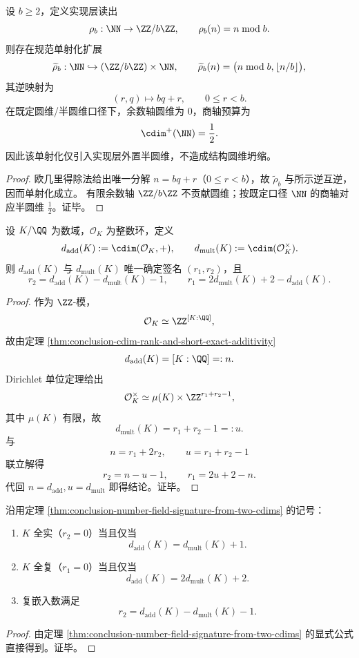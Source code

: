 \begin{proposition}[模读出的实现层外置轴预算]\label{prop:conclusion-mod-readout-external-half-circle-budget}
设 \(b\ge 2\)，定义实现层读出
\[
\rho_b:\NN\to \ZZ/b\ZZ,\qquad \rho_b(n)=n\bmod b.
\]
则存在规范单射化扩展
\[
\widetilde\rho_b:\NN\hookrightarrow (\ZZ/b\ZZ)\times\NN,\qquad
\widetilde\rho_b(n)=\bigl(n\bmod b,\lfloor n/b\rfloor\bigr),
\]
其逆映射为
\[
(r,q)\longmapsto bq+r,\qquad 0\le r<b.
\]
在既定圆维/半圆维口径下，余数轴圆维为 \(0\)，商轴预算为
\[
\cdim^+(\NN)=\frac12.
\]
因此该单射化仅引入实现层外置半圆维，不造成结构圆维坍缩。
\end{proposition}
\begin{proof}
欧几里得除法给出唯一分解 \(n=bq+r\)（\(0\le r<b\)），故 \(\widetilde\rho_b\) 与所示逆互逆，因而单射化成立。
有限余数轴 \(\ZZ/b\ZZ\) 不贡献圆维；按既定口径 \(\NN\) 的商轴对应半圆维 \(\frac12\)。证毕。
\end{proof}

\begin{theorem}[数域两类圆维决定阿基米德签名]\label{thm:conclusion-number-field-signature-from-two-cdims}
设 \(K/\QQ\) 为数域，\(\mathcal O_K\) 为整数环，定义
\[
d_{\mathrm{add}}(K):=\cdim(\mathcal O_K,+),\qquad
d_{\mathrm{mult}}(K):=\cdim(\mathcal O_K^\times).
\]
则 \(d_{\mathrm{add}}(K)\) 与 \(d_{\mathrm{mult}}(K)\) 唯一确定签名 \((r_1,r_2)\)，且
\[
r_2=d_{\mathrm{add}}(K)-d_{\mathrm{mult}}(K)-1,\qquad
r_1=2d_{\mathrm{mult}}(K)+2-d_{\mathrm{add}}(K).
\]
\end{theorem}
\begin{proof}
作为 \(\ZZ\)-模，
\[
\mathcal O_K\simeq \ZZ^{[K:\QQ]},
\]
故由定理 \ref{thm:conclusion-cdim-rank-and-short-exact-additivity}
\[
d_{\mathrm{add}}(K)=[K:\QQ]=:n.
\]
Dirichlet 单位定理给出
\[
\mathcal O_K^\times\simeq \mu(K)\times \ZZ^{r_1+r_2-1},
\]
其中 \(\mu(K)\) 有限，故
\[
d_{\mathrm{mult}}(K)=r_1+r_2-1=:u.
\]
与
\[
n=r_1+2r_2,\qquad u=r_1+r_2-1
\]
联立解得
\[
r_2=n-u-1,\qquad r_1=2u+2-n.
\]
代回 \(n=d_{\mathrm{add}},u=d_{\mathrm{mult}}\) 即得结论。证毕。
\end{proof}

\begin{corollary}[全实/全复判别与复嵌入缺口]\label{cor:conclusion-real-complex-signature-gap-criterion}
沿用定理 \ref{thm:conclusion-number-field-signature-from-two-cdims} 的记号：
\begin{enumerate}
  \item \(K\) 全实（\(r_2=0\)）当且仅当
  \[
  d_{\mathrm{add}}(K)=d_{\mathrm{mult}}(K)+1.
  \]
  \item \(K\) 全复（\(r_1=0\)）当且仅当
  \[
  d_{\mathrm{add}}(K)=2d_{\mathrm{mult}}(K)+2.
  \]
  \item 复嵌入数满足
  \[
  r_2=d_{\mathrm{add}}(K)-d_{\mathrm{mult}}(K)-1.
  \]
\end{enumerate}
\end{corollary}
\begin{proof}
由定理 \ref{thm:conclusion-number-field-signature-from-two-cdims} 的显式公式直接得到。证毕。
\end{proof}

